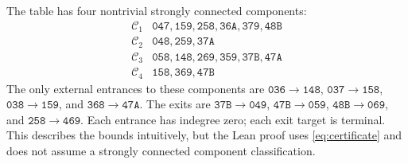 \documentclass[11pt,letterpaper]{article}
\theoremstyle{definition}\newtheorem{definition}[theorem]{Definition}
\newcommand{\typ}[1]{\mathtt{#1}}
\begin{document}
The table has four nontrivial strongly connected components:
\[
\begin{array}{c|l}
\mathcal C_1&\typ{047},\typ{159},\typ{258},\typ{36A},\typ{379},\typ{48B}\\
\mathcal C_2&\typ{048},\typ{259},\typ{37A}\\
\mathcal C_3&\typ{058},\typ{148},\typ{269},\typ{359},\typ{37B},\typ{47A}\\
\mathcal C_4&\typ{158},\typ{369},\typ{47B}
\end{array}
\]
The only external entrances to these components are
$\typ{036}\to\typ{148}$, $\typ{037}\to\typ{158}$,
$\typ{038}\to\typ{159}$, and $\typ{368}\to\typ{47A}$.
The exits are $\typ{37B}\to\typ{049}$, $\typ{47B}\to\typ{059}$,
$\typ{48B}\to\typ{069}$, and $\typ{258}\to\typ{469}$.
Each entrance has indegree zero; each exit target is terminal. This describes the bounds intuitively, but the Lean proof uses \eqref{eq:certificate} and does not assume a strongly connected component classification.

\clearpage
\end{document}
